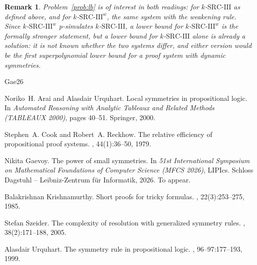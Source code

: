 \documentclass[10pt]{article}
\newtheorem{remark}[theorem]{Remark}
\newcommand{\SRCIII}{\text{SRC-III}}
\begin{document}
\begin{remark}\label{rem:weak}
Problem~\ref{prob:lb} is of interest in both readings:
for $k$-$\SRCIII$ as defined above, and for $k$-$\SRCIII^{w}$, the same system
with the weakening rule. Since $k$-$\SRCIII^{w}$ p-simulates $k$-$\SRCIII$, a
lower bound for $k$-$\SRCIII^{w}$ is the formally stronger statement, but a
lower bound for $k$-$\SRCIII$ alone is already a solution: it is not known
whether the two systems differ, and either version would be the first
superpolynomial lower bound for a proof system with dynamic symmetries.
\end{remark}

\begin{thebibliography}{Gae26}

Noriko~H. Arai and Alasdair Urquhart.
\newblock Local symmetries in propositional logic.
\newblock In {\em Automated Reasoning with Analytic Tableaux and Related
  Methods (TABLEAUX 2000)}, pages 40--51. Springer, 2000.

Stephen~A. Cook and Robert~A. Reckhow.
\newblock The relative efficiency of propositional proof systems.
, 44(1):36--50, 1979.

Nikita Gaevoy.
\newblock The power of small symmetries.
\newblock In {\em 51st International Symposium on Mathematical Foundations of
  Computer Science (MFCS 2026)}, LIPIcs. Schloss Dagstuhl -- Leibniz-Zentrum
  f\"{u}r Informatik, 2026.
\newblock To appear.

Balakrishnan Krishnamurthy.
\newblock Short proofs for tricky formulas.
, 22(3):253--275, 1985.

Stefan Szeider.
\newblock The complexity of resolution with generalized symmetry rules.
, 38(2):171--188, 2005.

Alasdair Urquhart.
\newblock The symmetry rule in propositional logic.
, 96--97:177--193, 1999.

\end{thebibliography}
\end{document}
